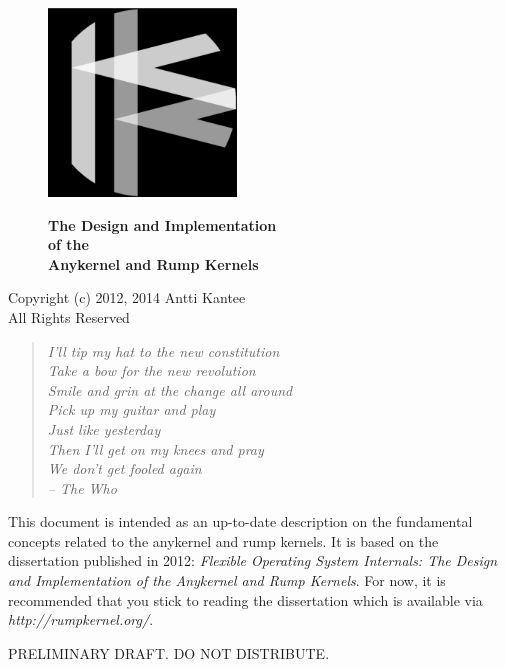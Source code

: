 \documentclass[openright]{tkkdiss}
\begin{document}
\thispagestyle{empty}
\pagecolor{blue}\afterpage{\nopagecolor}
\begin{figure}[t]
\includegraphics[width=5cm]{logo.pdf}

{\color{white} \fontsize{50}{50}\bfseries The Design and Implementation\\
of the\\
Anykernel and Rump Kernels\\
}
\end{figure}

\cleardoublepage

Copyright (c) 2012, 2014 Antti Kantee\\
All Rights Reserved

\begin{preface}
\pagecolor{white}

\begin{verse}
\textit{I'll tip my hat to the new constitution\\
Take a bow for the new revolution\\
Smile and grin at the change all around\\
Pick up my guitar and play\\
Just like yesterday\\
Then I'll get on my knees and pray\\
We don't get fooled again\\
-- The Who}
\end{verse}

This document is intended as an up-to-date description on the fundamental
concepts related to the anykernel and rump kernels.  It is based on
the dissertation published in 2012: \textit{Flexible Operating System
Internals: The Design and Implementation of the Anykernel and Rump
Kernels}.  For now, it is recommended that you stick to reading the
dissertation which is available via \textit{http://rumpkernel.org/}.

{\large PRELIMINARY DRAFT.  DO NOT DISTRIBUTE.}

\end{preface}


\tableofcontents


\begin{listofabbreviations}

\printnomenclature[5cm]

\end{listofabbreviations}


\listoffigures
\listoftables







\end{document}
